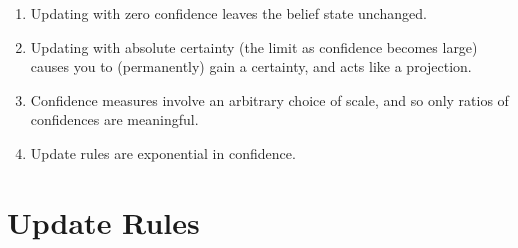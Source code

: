 \documentclass{article}
\begin{document}
\begin{enumerate}[nosep]
    \item Updating with zero confidence leaves the belief state unchanged.
    \item Updating with absolute certainty (the limit as confidence becomes large) causes you to (permanently) gain a certainty, and acts like a projection.
    \item Confidence measures involve an arbitrary choice of scale, and so only ratios of confidences are meaningful.
    \item Update rules are exponential in confidence.
\end{enumerate}



\section{Update Rules}
\def\X{\mathcal X}
\end{document}
